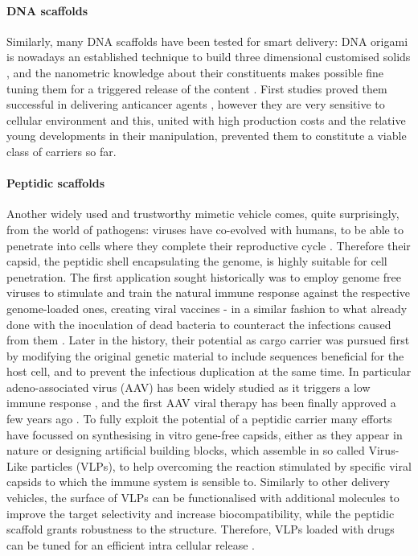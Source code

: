\paragraph{DNA scaffolds} Similarly, many DNA scaffolds have been tested for smart delivery: DNA origami is nowadays an established technique to build three dimensional customised solids \cite{Linko2015}, and the nanometric knowledge about their constituents makes possible fine tuning them for a triggered release of the content \cite{Douglas2012}. First studies proved them successful in delivering anticancer agents \cite{Zhang2014, Jiang2012}, however they are very sensitive to cellular environment and this, united with high production costs and the relative young developments in their manipulation, prevented them to constitute a viable class of carriers so far.

\paragraph{Peptidic scaffolds} Another widely used and trustworthy mimetic vehicle comes, quite surprisingly, from the world of pathogens: viruses have co-evolved with humans, to be able to penetrate into cells where they complete their reproductive cycle \cite{Lobo2009}. Therefore their capsid, the peptidic shell encapsulating the genome, is highly suitable for cell penetration. The first application sought historically was to employ genome free viruses to stimulate and train the natural immune response against the respective genome-loaded ones, creating viral vaccines - in a similar fashion to what already done with the inoculation of dead bacteria to counteract the infections caused from them \cite{Lauer2017}.
Later in the history, their potential as cargo carrier was pursued first by modifying the original genetic material to include sequences beneficial for the host cell, and to prevent the infectious duplication at the same time. In particular adeno-associated virus (AAV) has been widely studied \cite{Daya2008} as it triggers a low immune response \cite{Buning2015}, and the first AAV viral therapy has been finally approved a few years ago \cite{Smalley2017}.
%
To fully exploit the potential of a peptidic carrier many efforts have focussed on synthesising in vitro gene-free capsids, either as they appear in nature \cite{Wu2009} or designing artificial building blocks, which assemble in so called Virus-Like particles (VLPs), to help overcoming the reaction stimulated by specific viral capsids to which the immune system is sensible to.
%
Similarly to other delivery vehicles, the surface of VLPs can be functionalised with additional molecules to improve the target selectivity and increase biocompatibility, while the peptidic scaffold grants robustness to the structure. Therefore, VLPs loaded with drugs can be tuned for an efficient intra cellular release \cite{Ma2012}.

